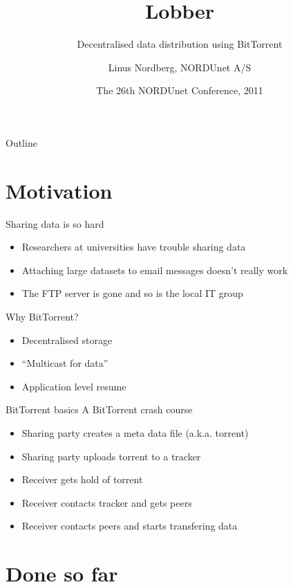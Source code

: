\documentclass{beamer}
\title
{Lobber}
\subtitle
{Decentralised data distribution using BitTorrent}
\author
{Linus Nordberg, NORDUnet A/S}
\date[NDN 2011]
{The 26th NORDUnet Conference, 2011}
\begin{document}
\begin{frame}
  \titlepage
\end{frame}
\begin{frame}{Outline}
  \tableofcontents
\end{frame}
\section{Motivation}

\begin{frame}{Sharing data is so hard}
  \begin{itemize}
  \item
    Researchers at universities have trouble sharing data
  \item
    Attaching large datasets to email messages doesn't really work
  \item
    The FTP server is gone and so is the local IT group
  \end{itemize}
\end{frame}

\begin{frame}{Why BitTorrent?}
  \begin{itemize}
  \item
    Decentralised storage
  \item
    ``Multicast for data''
  \item
    Application level resume
  \end{itemize}
\end{frame}

\begin{frame}{BitTorrent basics}
  A BitTorrent crash course
  \begin{itemize}
  \item
    Sharing party creates a meta data file (a.k.a. torrent)
  \item
    Sharing party uploads torrent to a tracker
  \item
    Receiver gets hold of torrent
  \item
    Receiver contacts tracker and gets peers
  \item
    Receiver contacts peers and starts transfering data
  \end{itemize}
\end{frame}
\section{Done so far}
\end{document}
